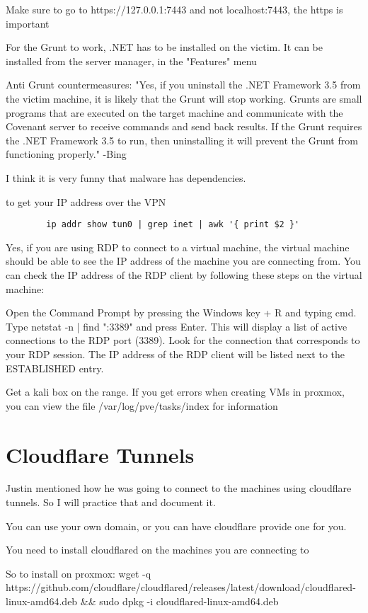 \documentclass{article}
\begin{document}
Make sure to go to https://127.0.0.1:7443 and not localhost:7443, the https is important

For the Grunt to work, .NET has to be installed on the victim.
It can be installed from the server manager, in the "Features" menu

Anti Grunt countermeasures:
"Yes, if you uninstall the .NET Framework 3.5 from the victim machine, 
it is likely that the Grunt will stop working. Grunts are small programs 
that are executed on the target machine and communicate with the 
Covenant server to receive commands and send back results. 
If the Grunt requires the .NET Framework 3.5 to run, 
then uninstalling it will prevent the Grunt from functioning properly." -Bing

I think it is very funny that malware has dependencies.

to get your IP address over the VPN
\begin{lstlisting}
        ip addr show tun0 | grep inet | awk '{ print $2 }'
\end{lstlisting}

Yes, if you are using RDP to connect to a virtual machine, the virtual machine should be able to see the IP address of the machine you are connecting from. You can check the IP address of the RDP client by following these steps on the virtual machine:

Open the Command Prompt by pressing the Windows key + R and typing cmd.
Type netstat -n | find ":3389" and press Enter. This will display a list of active connections to the RDP port (3389).
Look for the connection that corresponds to your RDP session. The IP address of the RDP client will be listed next to the ESTABLISHED entry.

Get a kali box on the range. If you get errors when creating VMs in proxmox, you can view the file /var/log/pve/tasks/index for information

\section{Cloudflare Tunnels}
Justin mentioned how he was going to connect to the machines using cloudflare tunnels. So I will practice that and document it.

You can use your own domain, or you can have cloudflare provide one for you.

You need to install cloudflared on the machines you are connecting to

So to install on proxmox:
wget -q https://github.com/cloudflare/cloudflared/releases/latest/download/cloudflared-linux-amd64.deb \&\& sudo dpkg -i cloudflared-linux-amd64.deb
\end{document}
